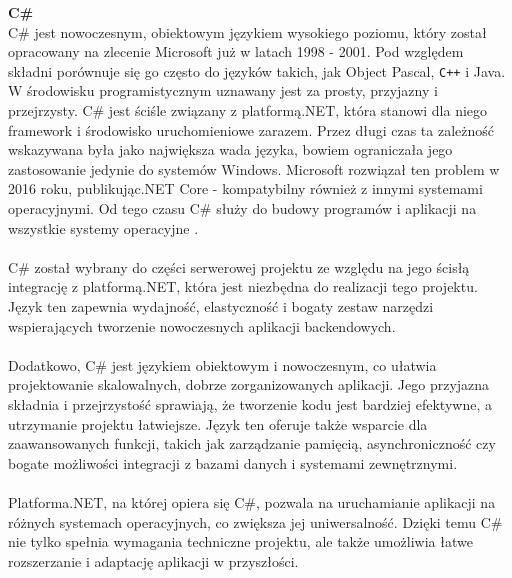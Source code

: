 \documentclass[twoside]{projektInzynierskiMS1}
\begin{document}
\noindent \textbf{C\#}\\
C\# jest nowoczesnym, obiektowym językiem wysokiego poziomu, który został opracowany na zlecenie Microsoft już w latach 1998 - 2001. Pod względem składni porównuje się go często do języków takich, jak Object Pascal, \texttt{C++} i Java. W środowisku programistycznym uznawany jest za prosty, przyjazny i przejrzysty. C\# jest ściśle związany z platformą.NET, która stanowi dla niego framework i środowisko uruchomieniowe zarazem. Przez długi czas ta zależność wskazywana była jako największa wada języka, bowiem ograniczała jego zastosowanie jedynie do systemów Windows. Microsoft rozwiązał ten problem w 2016 roku, publikując.NET Core - kompatybilny również z innymi systemami operacyjnymi. Od tego czasu C\# służy do budowy programów i aplikacji na wszystkie systemy operacyjne \cite{CSharp}.
\\\\
C\# został wybrany do części serwerowej projektu ze względu na jego ścisłą integrację z platformą.NET, która jest niezbędna do realizacji tego projektu. Język ten zapewnia wydajność, elastyczność i bogaty zestaw narzędzi wspierających tworzenie nowoczesnych aplikacji backendowych.
\\\\
Dodatkowo, C\# jest językiem obiektowym i nowoczesnym, co ułatwia projektowanie skalowalnych, dobrze zorganizowanych aplikacji. Jego przyjazna składnia i przejrzystość sprawiają, że tworzenie kodu jest bardziej efektywne, a utrzymanie projektu łatwiejsze. Język ten oferuje także wsparcie dla zaawansowanych funkcji, takich jak zarządzanie pamięcią, asynchroniczność czy bogate możliwości integracji z bazami danych i systemami zewnętrznymi.
\\\\
Platforma.NET, na której opiera się C\#, pozwala na uruchamianie aplikacji na różnych systemach operacyjnych, co zwiększa jej uniwersalność. Dzięki temu C\# nie tylko spełnia wymagania techniczne projektu, ale także umożliwia łatwe rozszerzanie i adaptację aplikacji w przyszłości.
\\
\end{document}
